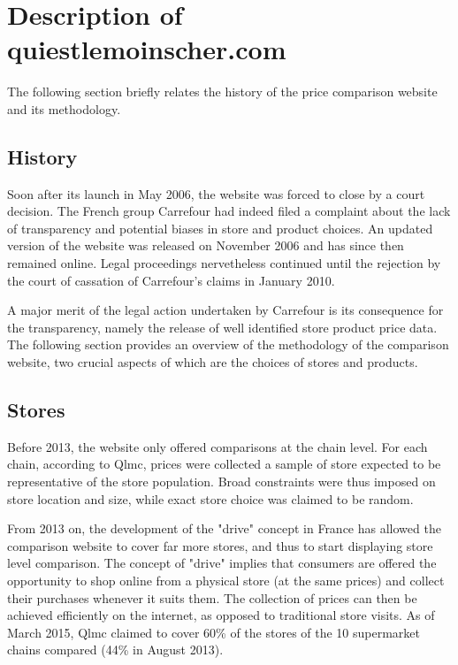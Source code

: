 \documentclass[11pt]{article}
\begin{document}
\section{Description of quiestlemoinscher.com}

The following section briefly relates the history of the price comparison website and its methodology.

\subsection{History}

Soon after its launch in May 2006, the website was forced to close by a court decision. The French group Carrefour had indeed filed a complaint about the lack of transparency and potential biases in store and product choices. An updated version of the website was released on November 2006 and has since then remained online. Legal proceedings nervetheless continued until the rejection by the court of cassation of Carrefour's claims in January 2010.

A major merit of the legal action undertaken by Carrefour is its consequence for the transparency, namely the release of well identified store product price data. The following section provides an overview of the methodology of the comparison website, two crucial aspects of which are the choices of stores and products.

\subsection{Stores}

Before 2013, the website only offered comparisons at the chain level. For each chain, according to Qlmc, prices were collected a sample of store expected to be representative of the store population. Broad constraints were thus imposed on store location and size, while exact store choice was claimed to be random.

From 2013 on, the development of the "drive" concept in France has allowed the comparison website to cover far more stores, and thus to start displaying store level comparison. The concept of "drive" implies that consumers are offered the opportunity to shop online from a physical store (at the same prices) and collect their purchases whenever it suits them. The collection of prices can then be achieved efficiently on the internet, as opposed to traditional store visits. As of March 2015, Qlmc claimed to cover 60\% of the stores of the 10 supermarket chains compared (44\% in August 2013).
\end{document}

